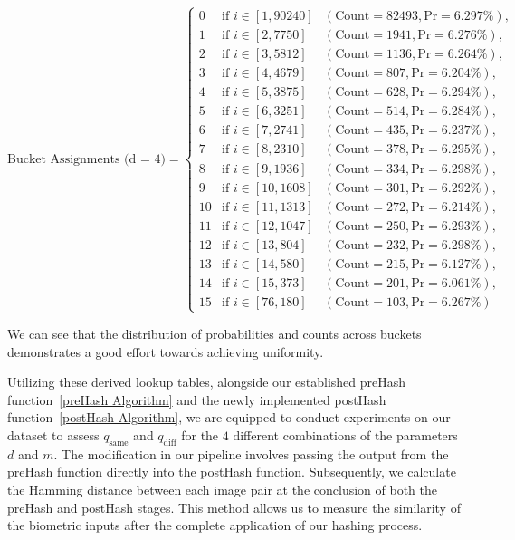 \renewcommand{\arraystretch}{1.25}
\[
\text{Bucket Assignments (d = 4)} = \left\{
\begin{array}{lll}
    0 & \text{if } i \in [1, 90240] & (\text{Count} = 82493, \text{Pr} = 6.297\%), \\
    1 & \text{if } i \in [2, 7750] & (\text{Count} = 1941, \text{Pr} = 6.276\%), \\
    2 & \text{if } i \in [3, 5812] & (\text{Count} = 1136, \text{Pr} = 6.264\%), \\
    3 & \text{if } i \in [4, 4679] & (\text{Count} = 807, \text{Pr} = 6.204\%), \\
    4 & \text{if } i \in [5, 3875] & (\text{Count} = 628, \text{Pr} = 6.294\%), \\
    5 & \text{if } i \in [6, 3251] & (\text{Count} = 514, \text{Pr} = 6.284\%), \\
    6 & \text{if } i \in [7, 2741] & (\text{Count} = 435, \text{Pr} = 6.237\%), \\
    7 & \text{if } i \in [8, 2310] & (\text{Count} = 378, \text{Pr} = 6.295\%), \\
    8 & \text{if } i \in [9, 1936] & (\text{Count} = 334, \text{Pr} = 6.298\%), \\
    9 & \text{if } i \in [10, 1608] & (\text{Count} = 301, \text{Pr} = 6.292\%), \\
    10 & \text{if } i \in [11, 1313] & (\text{Count} = 272, \text{Pr} = 6.214\%), \\
    11 & \text{if } i \in [12, 1047] & (\text{Count} = 250, \text{Pr} = 6.293\%), \\
    12 & \text{if } i \in [13, 804] & (\text{Count} = 232, \text{Pr} = 6.298\%), \\
    13 & \text{if } i \in [14, 580] & (\text{Count} = 215, \text{Pr} = 6.127\%), \\
    14 & \text{if } i \in [15, 373] & (\text{Count} = 201, \text{Pr} = 6.061\%), \\
    15 & \text{if } i \in [76, 180] & (\text{Count} = 103, \text{Pr} = 6.267\%)
\end{array}
\right.
\]


We can see that the distribution of probabilities and counts across buckets demonstrates a good effort towards achieving uniformity.

Utilizing these derived lookup tables, alongside our established preHash function~\ref{preHash Algorithm} and the newly implemented postHash function~\ref{postHash Algorithm}, we are equipped to conduct experiments on our dataset to assess \(q_{\text{same}}\) and \(q_{\text{diff}}\) for the \(4\) different combinations of the parameters \(d\) and \(m\). The modification in our pipeline involves passing the output from the preHash function directly into the postHash function. Subsequently, we calculate the Hamming distance between each image pair at the conclusion of both the preHash and postHash stages. This method allows us to measure the similarity of the biometric inputs after the complete application of our hashing process.


